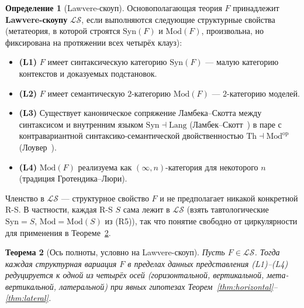 \documentclass[11pt]{article}
\theoremstyle{plain}
\newtheorem{theorem}{Теорема}[section]
\theoremstyle{definition}
\newtheorem{definition}[theorem]{Определение}
\newcommand{\cS}{\mathcal{S}}
\newcommand{\cL}{\mathcal{L}}
\newcommand{\Syn}{\mathrm{Syn}}
\newcommand{\Mod}{\mathrm{Mod}}
\begin{document}
\begin{definition}[Lawvere-скоуп]\label{def:law-scope}
Основополагающая теория $F$ принадлежит \textbf{Lawvere-скоупу} $\cL\cS$, если выполняются следующие структурные свойства (метатеория, в которой строятся $\Syn(F)$ и $\Mod(F)$, произвольна, но фиксирована на протяжении всех четырёх клауз):
\begin{itemize}
\item \textbf{(L1)} $F$ имеет синтаксическую категорию $\Syn(F)$ --- малую категорию контекстов и доказуемых подстановок.
\item \textbf{(L2)} $F$ имеет семантическую $2$-категорию $\Mod(F)$ --- $2$-категорию моделей.
\item \textbf{(L3)} Существует каноническое сопряжение Ламбека--Скотта между синтаксисом и внутренним языком $\Syn \dashv \mathrm{Lang}$ (Ламбек--Скотт~\cite{LambekScott1986}) в паре с контравариантной синтаксико-семантической двойственностью $\mathrm{Th} \dashv \Mod^{\mathrm{op}}$ (Лоувер~\cite{Lawvere1969}).
\item \textbf{(L4)} $\Mod(F)$ реализуема как $(\infty, n)$-категория для некоторого $n$ (традиция Гротендика--Люри).
\end{itemize}
Членство в $\cL\cS$ — структурное свойство $F$ и не предполагает никакой конкретной R-S. В частности, каждая R-S $S$ сама лежит в $\cL\cS$ (взять тавтологические $\Syn = S$, $\Mod = \Mod(S)$ из (R5)), так что понятие свободно от циркулярности для применения в Теореме~\ref{thm:completeness}.
\end{definition}

\begin{theorem}[Ось полноты, условно на Lawvere-скоуп]\label{thm:completeness}
Пусть $F \in \cL\cS$. Тогда каждая структурная вариация $F$ в пределах данных представления (L1)--(L4) редуцируется к одной из четырёх осей (горизонтальной, вертикальной, мета-вертикальной, латеральной) при явных гипотезах Теорем~\ref{thm:horizontal}--\ref{thm:lateral}.
\end{theorem}
\end{document}
